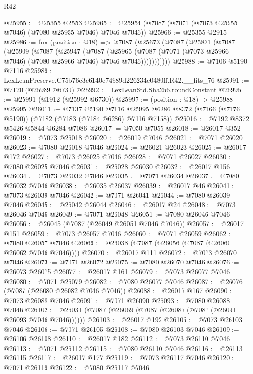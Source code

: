 \begin{lexlean}{R42}
\begin{coremodule}
{@25955 := @25355 @2553
@25965 := @25954 (@7087 (@7071 (@7073 @25955 @7046) (@7080 @25955 @7046) @7046 @7046))
@25966 := @25355 @2915
@25986 := fun (position : @18) =>
  @7087
    (@25673
      (@7087
        (@25831
          (@7087
            (@25909
              (@7087
                (@25947
                  (@7087
                    (@25965
                      (@7087 (@7071 (@7073 @25966 @7046) (@7080 @25966 @7046) @7046 @7046)))))))))))
@25988 := @7106 @5190 @7116
@25989 := LexLeanPreserve.C75b76e3c6140e74989d226234e0480ff.R42.__fits_76
@25991 := @7120 (@25989 @6730)
@25992 := LexLeanStd.Sha256.roundConstant
@25995 := @25991 (@1912 (@25992 @6730))
@25997 := (position : @18) -> @25988 @25995
@26011 := @7137
    @5190
    @7116
    @25995
    @6286
    @8372
    (@7166 (@7176 @5190))
    (@7182 (@7183 (@7184 @6286) @7116 @7158))
@26016 := @7192 @8372 @5426 @5844 @6284 @7086
@26017 := @7050 @7055
@26018 := @26017 @352
@26019 := @7073 @26018
@26020 := @26019 @7046
@26021 := @7071 @26020
@26023 := @7080 @26018 @7046
@26024 := @26021 @26023
@26025 := @26017 @172
@26027 := @7073 @26025 @7046
@26028 := @7071 @26027
@26030 := @7080 @26025 @7046
@26031 := @26028 @26030
@26032 := @26017 @156
@26034 := @7073 @26032 @7046
@26035 := @7071 @26034
@26037 := @7080 @26032 @7046
@26038 := @26035 @26037
@26039 := @26017 @46
@26041 := @7073 @26039 @7046
@26042 := @7071 @26041
@26044 := @7080 @26039 @7046
@26045 := @26042 @26044
@26046 := @26017 @24
@26048 := @7073 @26046 @7046
@26049 := @7071 @26048
@26051 := @7080 @26046 @7046
@26056 := @26045 (@7087 (@26049 @26051 @7046 @7046))
@26057 := @26017 @151
@26059 := @7073 @26057 @7046
@26060 := @7071 @26059
@26062 := @7080 @26057 @7046
@26069 := @26038 (@7087 (@26056 (@7087 (@26060 @26062 @7046 @7046))))
@26070 := @26017 @111
@26072 := @7073 @26070 @7046
@26073 := @7071 @26072
@26075 := @7080 @26070 @7046
@26076 := @26073 @26075
@26077 := @26017 @161
@26079 := @7073 @26077 @7046
@26080 := @7071 @26079
@26082 := @7080 @26077 @7046
@26087 := @26076 (@7087 (@26080 @26082 @7046 @7046))
@26088 := @26017 @167
@26090 := @7073 @26088 @7046
@26091 := @7071 @26090
@26093 := @7080 @26088 @7046
@26102 := @26031 (@7087 (@26069 (@7087 (@26087 (@7087 (@26091 @26093 @7046 @7046))))))
@26103 := @26017 @192
@26105 := @7073 @26103 @7046
@26106 := @7071 @26105
@26108 := @7080 @26103 @7046
@26109 := @26106 @26108
@26110 := @26017 @182
@26112 := @7073 @26110 @7046
@26113 := @7071 @26112
@26115 := @7080 @26110 @7046
@26116 := @26113 @26115
@26117 := @26017 @177
@26119 := @7073 @26117 @7046
@26120 := @7071 @26119
@26122 := @7080 @26117 @7046
}
\end{coremodule}
\end{lexlean}
